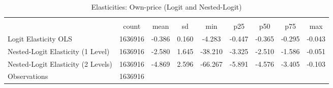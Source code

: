 \begin{table}[htbp]\centering
\def\sym#1{\ifmmode^{#1}\else\(^{#1}\)\fi}
\caption{Elasticities: Own-price (Logit and Nested-Logit)}
\begin{tabular}{l*{1}{cccccccc}}
\toprule
                    &\multicolumn{8}{c}{}                                                                                   \\
                    &       count&        mean&          sd&         min&         p25&         p50&         p75&         max\\
\midrule
Logit Elasticity OLS&     1636916&      -0.386&       0.160&      -4.283&      -0.447&      -0.365&      -0.295&      -0.043\\
Nested-Logit Elasticity (1 Level)&     1636916&      -2.580&       1.645&     -38.210&      -3.325&      -2.510&      -1.586&      -0.051\\
Nested-Logit Elasticity (2 Levels)&     1636916&      -4.869&       2.596&     -66.267&      -5.891&      -4.576&      -3.405&      -0.103\\
\midrule
Observations        &     1636916&            &            &            &            &            &            &            \\
\bottomrule
\end{tabular}
\end{table}
